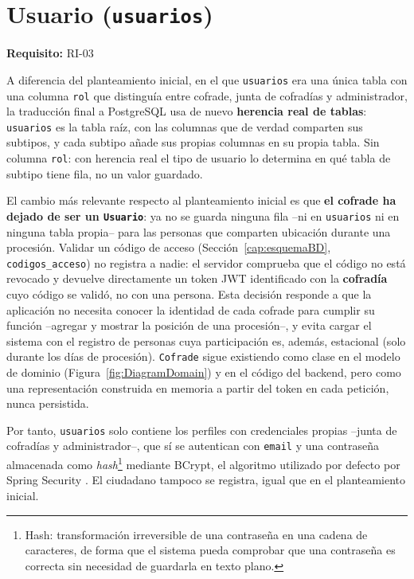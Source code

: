 \section{Usuario (\texttt{usuarios})}\label{sec:usuariosBD}
\textbf{Requisito:} RI-03

A diferencia del planteamiento inicial, en el que \texttt{usuarios} era una única tabla con una columna \texttt{rol} que distinguía entre cofrade, junta de cofradías y administrador, la traducción final a PostgreSQL usa de nuevo \textbf{herencia real de tablas}: \texttt{usuarios} es la tabla raíz, con las columnas que de verdad comparten sus subtipos, y cada subtipo añade sus propias columnas en su propia tabla. Sin columna \texttt{rol}: con herencia real el tipo de usuario lo determina en qué tabla de subtipo tiene fila, no un valor guardado.

El cambio más relevante respecto al planteamiento inicial es que \textbf{el cofrade ha dejado de ser un \texttt{Usuario}}: ya no se guarda ninguna fila --ni en \texttt{usuarios} ni en ninguna tabla propia-- para las personas que comparten ubicación durante una procesión. Validar un código de acceso (Sección~\ref{cap:esquemaBD}, \texttt{codigos\_acceso}) no registra a nadie: el servidor comprueba que el código no está revocado y devuelve directamente un token JWT identificado con la \textbf{cofradía} cuyo código se validó, no con una persona. Esta decisión responde a que la aplicación no necesita conocer la identidad de cada cofrade para cumplir su función --agregar y mostrar la posición de una procesión--, y evita cargar el sistema con el registro de personas cuya participación es, además, estacional (solo durante los días de procesión). \texttt{Cofrade} sigue existiendo como clase en el modelo de dominio (Figura~\ref{fig:DiagramDomain}) y en el código del backend, pero como una representación construida en memoria a partir del token en cada petición, nunca persistida.

Por tanto, \texttt{usuarios} solo contiene los perfiles con credenciales propias --junta de cofradías y administrador--, que sí se autentican con \texttt{email} y una contraseña almacenada como \emph{hash}\footnote{Hash: transformación irreversible de una contraseña en una cadena de caracteres, de forma que el sistema pueda comprobar que una contraseña es correcta sin necesidad de guardarla en texto plano.} mediante BCrypt, el algoritmo utilizado por defecto por Spring Security \cite{springsecurity}. El ciudadano tampoco se registra, igual que en el planteamiento inicial.

